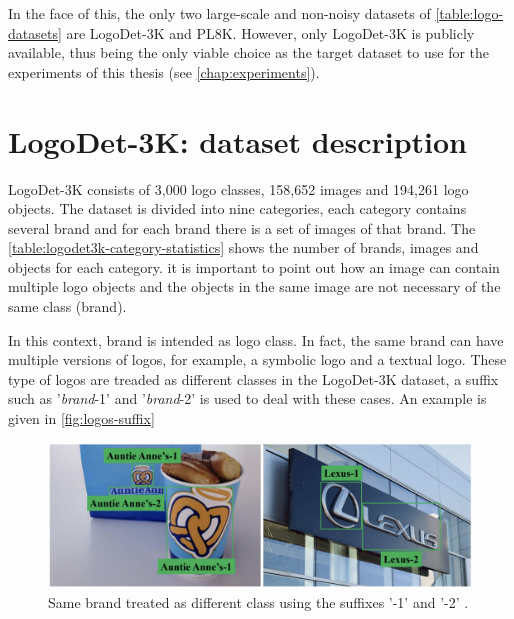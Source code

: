 In the face of this, the only two large-scale and non-noisy datasets of \autoref{table:logo-datasets} are LogoDet-3K and PL8K. However, only LogoDet-3K is publicly available, thus being the only viable choice as the target dataset to use for the experiments of this thesis (see \autoref{chap:experiments}).


\section{LogoDet-3K: dataset description}
LogoDet-3K consists of 3,000 logo classes,
158,652 images and 194,261 logo objects. The dataset is divided into nine categories, each category contains several brand and for each brand there is a set of images of that brand. The \autoref{table:logodet3k-category-statistics} shows the number of brands, images and objects for each category. it is important to point out how an image can contain multiple logo objects and the objects in the same image are not necessary of the same class (brand).


In this context, brand is intended as logo class. In fact, the same brand can have multiple versions of logos, for example, a symbolic logo and a textual logo. These type of logos are treaded as different classes in the LogoDet-3K dataset, a suffix such as '\textit{brand}-1' and '\textit{brand}-2' is used to deal with these cases. An example is given in \autoref{fig:logos-suffix}


\begin{figure}%
	\centering

    \begin{center}
        \includegraphics[width=\columnwidth]{images/logos-suffix.png}
    \end{center}
	\caption{Same brand treated as different class using the suffixes '-1' and '-2' \cite{wang2022logodet}.}%
	\label{fig:logos-suffix}%
\end{figure}


